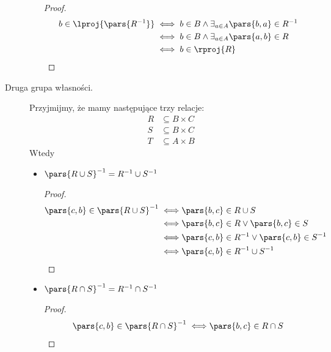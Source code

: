 \begin{description}
\begin{itemize}
\begin{proof}
			            \begin{equation*}
				            \begin{split}
					            b \in \lproj{\pars{R^{-1}}}
					             & \iff b \in B \land \exists_{a \in A}\pars{b, a} \in R^{-1} \\
					             & \iff b \in B \land \exists_{a \in A}\pars{a, b} \in R      \\
					             & \iff b \in \rproj{R}
				            \end{split}
			            \end{equation*}
		            \end{proof}
	      \end{itemize}
	\item[Druga grupa własności.] Przyjmijmy, że mamy następujące trzy relacje:
	      \begin{align*}
		      R & \subseteq B \times C \\
		      S & \subseteq B \times C \\
		      T & \subseteq A \times B
	      \end{align*}
	      Wtedy
	      \begin{itemize}
		      \item \(\pars{R \cup S}^{-1} = R^{-1} \cup S^{-1}\)
		            \begin{proof}
			            \begin{equation*}
				            \begin{split}
					            \pars{c, b} \in \pars{R \cup S}^{-1}
					            \iff & \pars{b, c} \in R \cup S                           \\
					            \iff & \pars{b, c} \in R \lor \pars{b, c} \in S           \\
					            \iff & \pars{c, b} \in R^{-1} \lor \pars{c, b} \in S^{-1} \\
					            \iff & \pars{c, b} \in R^{-1} \cup S^{-1}
				            \end{split}
			            \end{equation*}
		            \end{proof}
		      \item \(\pars{R \cap S}^{-1} = R^{-1} \cap S^{-1}\)
		            \begin{proof}
			            \begin{equation*}
				            \begin{split}
					            \pars{c, b} \in \pars{R \cap S}^{-1}
					            \iff & \pars{b, c} \in R \cap S                            \\

\end{split}
\end{equation*}
\end{proof}
\end{itemize}
\end{description}
